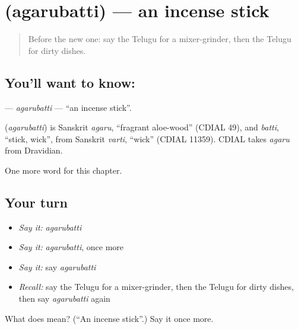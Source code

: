 \section[\texorpdfstring{\te{అగరుబత్తి} (agarubatti)}{అగరుబత్తి (agarubatti)}]{ (agarubatti) — an incense stick}

\label{lesson:TE-C307-agarubatti}



\begin{quote}
Before the new one: say the Telugu for a mixer-grinder, then the Telugu for dirty dishes.
\end{quote}

\subsection*{You'll want to know: }
\textbf{} — \emph{agarubatti} — \textquotedblleft{}an incense stick\textquotedblright{}.

\begin{cousinweb}
\textbf{} (\emph{agarubatti}) is Sanskrit \emph{agaru}, \textquotedblleft{}fragrant aloe-wood\textquotedblright{} (CDIAL 49), and \emph{batti}, \textquotedblleft{}stick, wick\textquotedblright{}, from Sanskrit \emph{varti}, \textquotedblleft{}wick\textquotedblright{} (CDIAL 11359). CDIAL takes \emph{agaru} from Dravidian.
\end{cousinweb}

\begin{grammarlens}[title={What you've built}]
One more word for this chapter.
\end{grammarlens}

\subsection*{Your turn}
\begin{itemize}
\raggedright
  \item \emph{Say it:} \emph{agarubatti}
  \item \emph{Say it:} \emph{agarubatti}, once more
  \item \emph{Say it:} say \emph{agarubatti}
  \item \emph{Recall:} say the Telugu for a mixer-grinder, then the Telugu for dirty dishes, then say \emph{agarubatti} again
\end{itemize}

\begin{tcolorbox}[breakable,colback=teal!4,colframe=teal!35!black,title={Before you move on}]
What does  mean? (\textquotedblleft{}An incense stick\textquotedblright{}.) Say it once more.
\end{tcolorbox}
